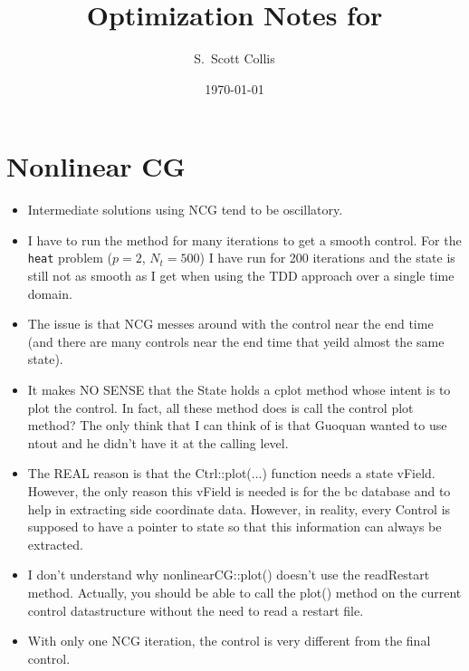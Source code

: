 \documentclass[12pt]{article}
\title{Optimization Notes for \sage}
\author{S.\ Scott Collis}
\date{\today}
\begin{document}
\maketitle


\section{Nonlinear CG}

\begin{itemize}

\item Intermediate solutions using NCG tend to be oscillatory.

\item I have to run the method for many iterations to get a smooth control.
For the {\tt heat} problem ($p=2$, $N_t=500$) I have run for 200 iterations
and the state is still not as smooth as I get when using the TDD approach over
a single time domain.

\item The issue is that NCG messes around with the control near the end time
(and there are many controls near the end time that yeild almost the same
state).

\item It makes NO SENSE that the State holds a cplot method whose intent is to
plot the control.  In fact, all these method does is call the control plot
method?  The only think that I can think of is that Guoquan wanted to use
ntout and he didn't have it at the calling level.

\item The REAL reason is that the Ctrl::plot(...) function needs a state
vField.  However, the only reason this vField is needed is for the bc database
and to help in extracting side coordinate data.  However, in reality, every
Control is supposed to have a pointer to state so that this information can
always be extracted.

\item I don't understand why nonlinearCG::plot() doesn't use the readRestart
method.  Actually, you should be able to call the plot() method on the current
control datastructure without the need to read a restart file.

\item With only one NCG iteration, the control is very different from the
final control.


\end{itemize}
\end{document}
